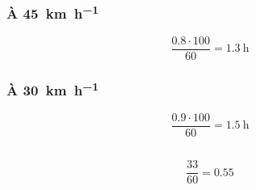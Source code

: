 \documentclass{article}
\begin{document}
\section{}
\subsection{}

\subsubsection{À \SI{45}{\kilo\meter\per\hour}}

$$\frac{0.8\cdot100}{60} = \SI{1.3}{\hour}$$

\subsubsection{À \SI{30}{\kilo\meter\per\hour}}

$$\frac{0.9\cdot100}{60} = \SI{1.5}{\hour}$$

\subsection{}

$$\frac{33}{60} = 0.55$$
\end{document}
